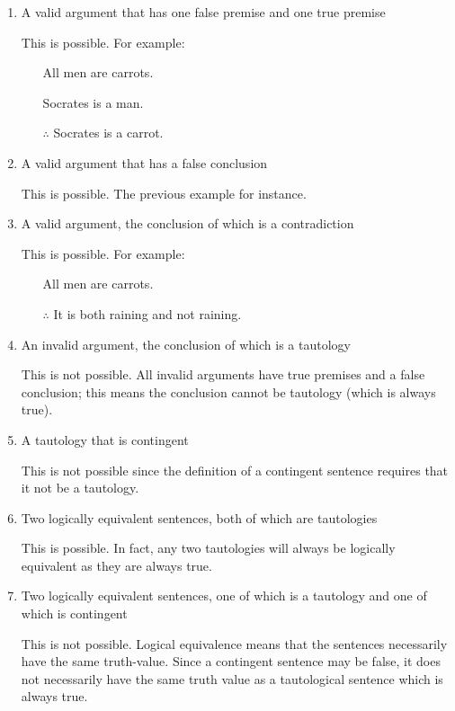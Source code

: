 \documentclass[12pt, letterpaper, twoside]{article}
\begin{document}
\begin{enumerate}
    \item A valid argument that has one false premise and
      one true premise

    This is possible. For example:
    \begin{itemize}
        \item[] All men are carrots.
        \item[] Socrates is a man.
        \item[$\therefore$] Socrates is a carrot.
    \end{itemize}

    \item A valid argument that has a false conclusion

    This is possible. The previous example for instance.

    \item A valid argument, the conclusion of which is a
      contradiction

    This is possible. For example:
    \begin{itemize}
        \item[] All men are carrots.
        \item[$\therefore$] It is both raining and not raining.
    \end{itemize}

    \item An invalid argument, the conclusion of which is a
      tautology

    This is not possible. All invalid arguments have true
    premises and a false conclusion; this means the
    conclusion cannot be tautology (which is always true).

    \item A tautology that is contingent

    This is not possible since the definition of a
    contingent sentence requires that it not be a tautology.

    \item Two logically equivalent sentences, both of which
      are tautologies

    This is possible. In fact, any two tautologies will
    always be logically equivalent as they are always true.

    \item Two logically equivalent sentences, one of which
      is a tautology and one of which is contingent

    This is not possible. Logical equivalence means that the
    sentences necessarily have the same truth-value. Since a
    contingent sentence may be false, it does not
    necessarily have the same truth value as a tautological
    sentence which is always true.


\end{enumerate}
\end{document}
